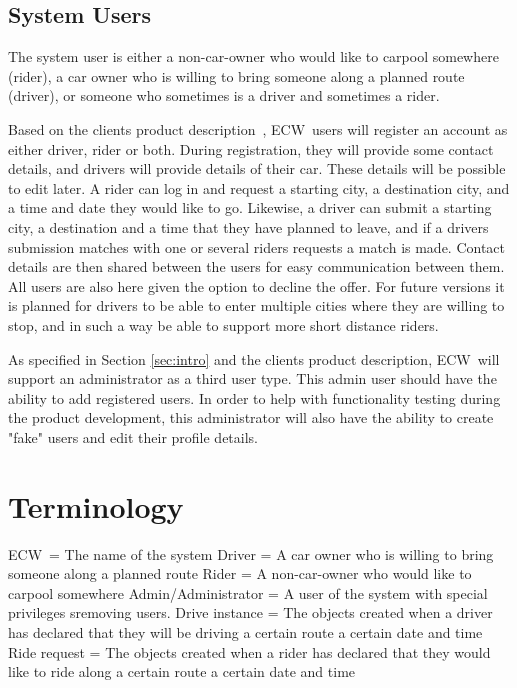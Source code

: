 \documentclass{article}
\newcommand{\name}{ECW\ }
\begin{document}
\subsection{System Users}
The system user is either a non-car-owner who would like to carpool somewhere (rider), a car owner who is willing to bring someone along a planned route (driver), or someone who sometimes is a driver and sometimes a rider.

Based on the clients product description~\cite{PH}, \name users will register an account as either driver, rider or both. During registration, they will provide some contact details, and drivers will provide details of their car. These details will be possible to edit later. A rider can log in and request a starting city, a destination city, and a time and date they would like to go. Likewise, a driver can submit a starting city, a destination and a time that they have planned to leave, and if a drivers submission matches with one or several riders requests a match is made. Contact details are then shared between the users for easy communication between them. All users are also here given the option to decline the offer. For future versions it is planned for drivers to be able to enter multiple cities where they are willing to stop, and in such a way be able to support more short distance riders.

As specified in Section \ref{sec:intro} and the clients product description\cite{PH}, \name will support an administrator as a third user type. This admin user should have the ability to add registered users. In order to help with functionality testing during the product development, this administrator will also have the ability to create "fake" users and edit their profile details.

\section{Terminology}
\name = The name of the system\newline
Driver = A car owner who is willing to bring someone along a planned route\newline
Rider = A non-car-owner who would like to carpool somewhere\newline
Admin/Administrator = A user of the system with special privileges sremoving users.\newline
Drive instance = The objects created when a driver has declared that they will be driving a certain route a certain date and time\newline
Ride request = The objects created when a rider has declared that they would like to ride along a certain route a certain date and time\newline
\end{document}
